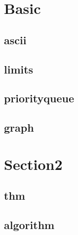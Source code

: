 \section{Basic}
    \subsection{ascii}
        
    \subsection{limits}
        
    \subsection{priorityqueue}
        
    \subsection{graph}
        

\section{Section2}
    \subsection{thm}
        
    \subsection{algorithm}
        